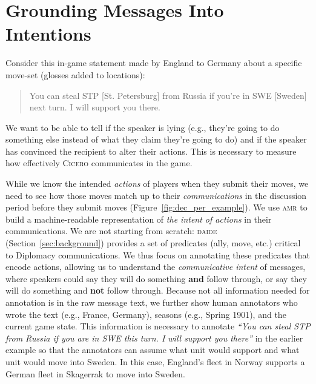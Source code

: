 \documentclass[oneside]{memoir}
\newcommand{\cicero}{\abr{Cicero} }
\newcommand{\abr}[1]{\textsc{#1}}
\begin{document}
\section{Grounding Messages Into  Intentions}


\label{sec:amr}
Consider this in-game statement made by England to Germany about a
specific move-set (glosses added to locations):
\begin{quote}
    You can steal STP [St. Petersburg] from Russia if you’re in SWE [Sweden] next turn. I will support you there.
\end{quote}
%
We want to be able to tell if the speaker is lying (e.g., they're
going to do something else instead of what they claim they're going to
do) and if the speaker has convinced the recipient to alter their
actions.
%
This is necessary to measure how effectively \cicero{} communicates in the game.

While we know the intended \emph{actions} of players when they submit their
moves, we need to see how those moves match up to their
\emph{communications} in the discussion period before they submit
moves (Figure~\ref{fig:dec_per_example}). 
%
We use \abr{amr} to build a
machine-readable representation of \textit{the intent of actions} in their communications. 
%
We are not starting from scratch: \abr{daide} (Section~\ref{sec:background}) provides a set of predicates (ally, move, etc.) critical to Diplomacy communications.
%
We thus focus on annotating these predicates that encode actions, allowing us to understand the \emph{communicative intent} of messages, where speakers could say they will do something \textbf{and} follow through, or say they will do something and \textbf{not} follow through.
% 
Because not all information needed for annotation is in the
raw message text, we further show human annotators who wrote the text (e.g., France,
Germany), seasons (e.g., Spring 1901), and the current game state.
%
This information is necessary to annotate \textit{``You can steal
  STP from Russia if you are in SWE this turn. I will support you there''} in the earlier example so that the annotators can assume what unit would support and what unit would move into Sweden.
%
In this case, England's fleet in Norway supports a German fleet in Skagerrak to move into Sweden.
\end{document}
